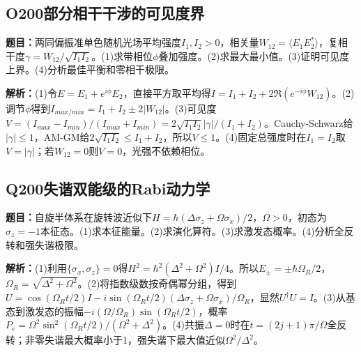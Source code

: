\subsection*{O200\quad 部分相干干涉的可见度界}
\textbf{题目：}两同偏振准单色随机光场平均强度$I_1,I_2>0$，相关量$W_{12}=\langle E_1E_2^*\rangle$，复相干度$\gamma=W_{12}/\sqrt{I_1I_2}$。(1)求带相位$\phi$叠加强度。(2)求最大最小值。(3)证明可见度上界。(4)分析最佳平衡和零相干极限。
\par\textbf{解析：}(1)令$E=E_1+e^{i\phi}E_2$，直接平方取平均得$I=I_1+I_2+2\Re(e^{-i\phi}W_{12})$。(2)调节$\phi$得到$I_{max/min}=I_1+I_2\pm2|W_{12}|$。(3)可见度$V=(I_{max}-I_{min})/(I_{max}+I_{min})=2\sqrt{I_1I_2}|\gamma|/(I_1+I_2)$。Cauchy-Schwarz给$|\gamma|\le1$，AM-GM给$2\sqrt{I_1I_2}\le I_1+I_2$，所以$V\le1$。(4)固定总强度时在$I_1=I_2$取$V=|\gamma|$；若$W_{12}=0$则$V=0$，光强不依赖相位。
\par\medskip
\subsection*{Q200\quad 失谐双能级的Rabi动力学}
\textbf{题目：}自旋半体系在旋转波近似下$H=\hbar(\Delta\sigma_z+\Omega\sigma_x)/2$，$\Omega>0$，初态为$\sigma_z=-1$本征态。(1)求本征能量。(2)求演化算符。(3)求激发态概率。(4)分析全反转和强失谐极限。
\par\textbf{解析：}(1)利用$\{\sigma_x,\sigma_z\}=0$得$H^2=\hbar^2(\Delta^2+\Omega^2)I/4$。所以$E_\pm=\pm\hbar\Omega_R/2$，$\Omega_R=\sqrt{\Delta^2+\Omega^2}$。(2)将指数级数按奇偶幂分组，得到$U=\cos(\Omega_Rt/2)I-i\sin(\Omega_Rt/2)(\Delta\sigma_z+\Omega\sigma_x)/\Omega_R$，显然$U^\dagger U=I$。(3)从基态到激发态的振幅$-i(\Omega/\Omega_R)\sin(\Omega_Rt/2)$，概率$P_e=\Omega^2\sin^2(\Omega_Rt/2)/(\Omega^2+\Delta^2)$。(4)共振$\Delta=0$时在$t=(2j+1)\pi/\Omega$全反转；非零失谐最大概率小于1，强失谐下最大值近似$\Omega^2/\Delta^2$。
\par\medskip
